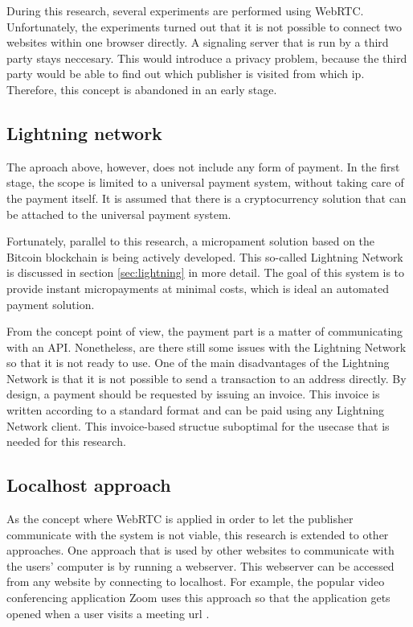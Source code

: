 During this research, several experiments are performed using WebRTC. Unfortunately, the experiments turned out that it is not possible to connect two websites within one browser directly. A signaling server that is run by a third party stays neccesary. This would introduce a privacy problem, because the third party would be able to find out which publisher is visited from which ip. Therefore, this concept is abandoned in an early stage.
\subsection{Lightning network}

The aproach above, however, does not include any form of payment. In the first stage, the scope is limited to a universal payment system, without taking care of the payment itself. It is assumed that there is a cryptocurrency solution that can be attached to the universal payment system.

Fortunately, parallel to this research, a micropament solution based on the Bitcoin blockchain is being actively developed. This so-called Lightning Network is discussed in section \ref{sec:lightning} in more detail. The goal of this system is to provide instant micropayments at minimal costs, which is ideal an automated payment solution.

From the concept point of view, the payment part is a matter of communicating with an API. Nonetheless, are there still some issues with the Lightning Network so that it is not ready to use. One of the main disadvantages of the Lightning Network is that it is not possible to send a transaction to an address directly. By design, a payment should be requested by issuing an invoice. This invoice is written according to a standard format and can be paid using any Lightning Network client. This invoice-based structue suboptimal for the usecase that is needed for this research.

\subsection{Localhost approach}

As the concept where WebRTC is applied in order to let the publisher communicate with the system is not viable, this research is extended to other approaches. One approach that is used by other websites to communicate with the users' computer is by running a webserver. This webserver can be accessed from any website by connecting to localhost. For example, the popular video conferencing application Zoom uses this approach so that the application gets opened when a user visits a meeting url \cite{zoomwebserver}.

